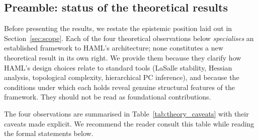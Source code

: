 \documentclass[11pt,a4paper]{article}
\begin{document}
\subsection*{Preamble: status of the theoretical results}

Before presenting the results, we restate the epistemic position laid out in
Section~\ref{sec:scope}. Each of the four theoretical observations below
\emph{specialises} an established framework to HAML's architecture; none constitutes a
new theoretical result in its own right. We provide them because they clarify how
HAML's design choices relate to standard tools (LaSalle stability, Hessian analysis,
topological complexity, hierarchical PC inference), and because the conditions under
which each holds reveal genuine structural features of the framework. They should not
be read as foundational contributions.

The four observations are summarised in Table~\ref{tab:theory_caveats} with their
caveats made explicit. We recommend the reader consult this table while reading the
formal statements below.
\end{document}
